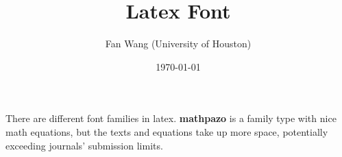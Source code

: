 \documentclass[12pt,english]{article}
\title{Latex Font}
\author{Fan Wang (University of Houston)}
\date{\today}
\begin{document}
There are different font families in latex. \textbf{mathpazo} is a family type with nice math equations, but the texts and equations take up more space, potentially exceeding journals' submission limits.
\end{document}
